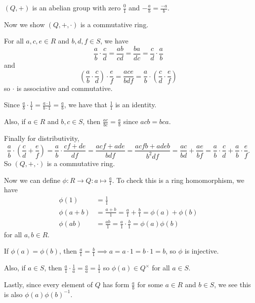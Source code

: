 \documentclass[12pt,letterpaper]{report}
\begin{document}
\begin{thmproof}
  \begin{tcolorbox}
    $(Q, +)$ is an abelian group with zero $\frac{0}{1}$ and $-\frac{a}{b} = \frac{-a}{b}$.
  \end{tcolorbox}

  Now we show $(Q, +, \cdot)$ is a commutative ring.

  For all $a, c, e \in R$ and $b, d, f \in S$, we have
  \[
    \frac{a}{b} \cdot \frac{c}{d} = \frac{ab}{cd} = \frac{ba}{dc} = \frac{c}{d} \cdot \frac{a}{b}
  \]
  and
  \[
    \left(\frac{a}{b} \cdot \frac{c}{d}\right) \cdot \frac{e}{f}
      = \frac{ace}{bdf} = \frac{a}{b} \cdot \left(\frac{c}{d} \cdot \frac{e}{f}\right)
  \]
  so $\cdot$ is associative and commutative.

  \begin{tcolorbox}
    Since $\frac{a}{b} \cdot \frac{1}{1} = \frac{a \cdot 1}{b \cdot 1} = \frac{a}{b}$, we have that
    $\frac{1}{1}$ is an identity.

    Also, if $a \in R$ and $b, c \in S$, then $\frac{ac}{bc} = \frac{a}{b}$ since $acb = bca$.
  \end{tcolorbox}

  Finally for distributivity,
  \[
    \frac{a}{b} \cdot \left(\frac{c}{d} + \frac{e}{f}\right)
      = \frac{a}{b} \cdot \frac{cf + de}{df}
      = \frac{acf + ade}{bdf}
      = \frac{acfb + adeb}{b^2df}
      = \frac{ac}{bd} + \frac{ae}{bf}
      = \frac{a}{b} \cdot \frac{c}{d} + \frac{a}{b} \cdot \frac{e}{f}.
  \]
  So $(Q, +, \cdot)$ is a commutative ring.

  Now we can define $\phi \colon R \to Q : a \mapsto \frac{a}{1}$.
  To check this is a ring homomorphism, we have
  \begin{align*}
    \phi(1) &= \frac{1}{1} \\
    \phi(a + b) &= \frac{a + b}{1} = \frac{a}{1} + \frac{b}{1} = \phi(a) + \phi(b) \\
    \phi(ab) &= \frac{ab}{1} = \frac{a}{1} \cdot \frac{b}{1} = \phi(a)\phi(b)
  \end{align*}
  for all $a, b \in R$.

  If $\phi(a) = \phi(b)$, then $\frac{a}{1} = \frac{b}{1} \implies a = a \cdot 1 = b \cdot 1 = b$,
  so $\phi$ is injective.

  Also, if $a \in S$, then $\frac{a}{1} \cdot \frac{1}{a} = \frac{a}{a} = \frac{1}{1}$ so
  $\phi(a) \in Q^\times$ for all $a \in S$.

  Lastly, since every element of $Q$ has form $\frac{a}{b}$ for some $a \in R$ and $b \in S$, we
  see this is also $\phi(a)\phi(b)^{-1}$.


\end{thmproof}
\end{document}
